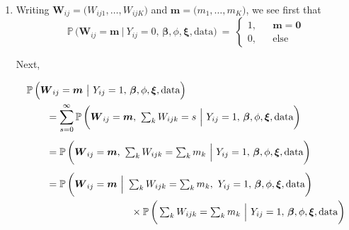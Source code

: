 \documentclass[11pt]{article}
\newcommand{\prob}{\mathbb{P}\,}
\renewcommand{\vec}{\boldsymbol}
\newcommand{\barM}{~\big|~}
\newcommand{\barB}{~\Big|~}
\newcommand{\barBBB}{~\Bigg|~}
\begin{document}
\begin{enumerate}[label=Step \arabic*., leftmargin=13mm]
\item Writing $\vec{W}_{ij} = \big( W_{ij1},\dots,W_{ijK} \big)$ and $\vec{m} = \big(m_1,\dots,m_K\big)$, we see first that
\[ \prob\Big( \vec{W}_{ij} = \vec{m} \barM Y_{ij} = 0,\, \vec{\beta}, \phi, \vec{\xi}, \text{data} \Big) ~=~ \left\{ \begin{array}{lll} 1, & & \vec{m} = \vec{0} \\[1ex] 0, & & \text{else} \end{array} \right.  \]

Next,

\begin{align*} \MoveEqLeft
\prob\Big( \vec{W}_{ij} = \vec{m} \barM Y_{ij} = 1,\, \vec{\beta}, \phi, \vec{\xi}, \text{data} \Big) \\
&= \sum_{s=0}^\infty \prob\bigg( \vec{W}_{ij} = \vec{m},~ \textstyle \sum_{k} W_{ijk} = s \barB Y_{ij} = 1,\, \vec{\beta}, \phi, \vec{\xi}, \text{data} \bigg) \\[1ex]
&= \prob\bigg( \vec{W}_{ij} = \vec{m},~ \textstyle \sum_{k} W_{ijk} = \sum_k m_k  \barB Y_{ij} = 1,\, \vec{\beta}, \phi, \vec{\xi}, \text{data} \bigg) \\[1ex]
&= \prob\bigg( \vec{W}_{ij} = \vec{m} \barB \textstyle \sum_{k} W_{ijk} = \sum_k m_k,~  Y_{ij} = 1,\, \vec{\beta}, \phi, \vec{\xi}, \text{data} \bigg) \\
& \hspace{30mm} \times \prob\bigg( \textstyle \sum_{k} W_{ijk} = \sum_k m_k \barB  Y_{ij} = 1,\, \vec{\beta}, \phi, \vec{\xi}, \text{data} \bigg)
\end{align*}



\end{enumerate}
\end{document}
